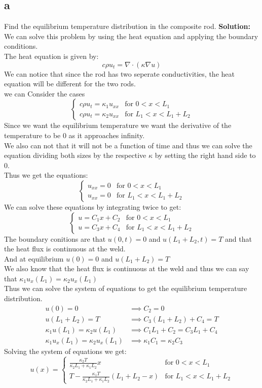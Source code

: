 \documentclass{article}
\begin{document}
\subsection*{a} Find the equilibrium temperature distribution in the composite rod.
\textbf{Solution:}\\
We can solve this problem by using the heat equation and applying the boundary conditions.\\
The heat equation is given by:
$$ c \rho u_t = \nabla \cdot (\kappa \nabla u)$$
We can notice that since the rod has two seperate conductivities, the heat equation will be different for the two rods.\\
we can Consider the cases
$$\begin{cases}
    c \rho u_{t} = \kappa_1 u_{xx} & \text{for } 0 < x < L_1\\
    c \rho u_{t} = \kappa_2 u_{xx} & \text{for } L_1 < x < L_1 + L_2
\end{cases}$$
Since we want the equilibrium temperature we want the derivative of the temperature to be 0 as it approaches infinity.\\
We also can not that it will not be a function of time and thus we can solve the equation dividing both sizes by the respective $\kappa$ by setting the right hand side to 0.\\
Thus we get the equations:
$$\begin{cases}
    u_{xx} = 0 & \text{for } 0 < x < L_1\\
    u_{xx} = 0 & \text{for } L_1 < x < L_1 + L_2
\end{cases}$$
We can solve these equations by integrating twice to get:
$$\begin{cases}
    u = C_1x + C_2 & \text{for } 0 < x < L_1\\
    u = C_3x + C_4 & \text{for } L_1 < x < L_1 + L_2
\end{cases}$$
The boundary conitions are that $u(0,t) = 0$ and $u(L_1 + L_2, t) = T$ and that the heat flux is continuous at the weld.\\
And at equilibrium $u(0) = 0$ and $u(L_1 + L_2) = T$\\
We also know that the heat flux is continuous at the weld and thus we can say that $\kappa_1 u_x(L_1) = \kappa_2 u_x(L_1)$\\
Thus we can solve the system of equations to get the equilibrium temperature distribution.\\
\begin{align*}
    u(0) = 0 & \implies C_2 = 0\\
    u(L_1 + L_2) = T & \implies C_3(L_1 + L_2) + C_4 = T\\
    \kappa_1 u(L_1) = \kappa_2 u(L_1) & \implies C_1L_1 + C_2 = C_3L_1 + C_4\\
    \kappa_1 u_x(L_1) = \kappa_2 u_x(L_1) & \implies \kappa_1C_1 = \kappa_2C_3
\end{align*}
Solving the system of equations we get:
$$ u(x) = \begin{cases}
    \frac{\kappa_2T}{\kappa_2L_1 + \kappa_1L_2}x & \text{for } 0 < x < L_1\\
    T - \frac{\kappa_1T}{\kappa_2L_1 + \kappa_1L_2}(L_1+L_2-x) & \text{for } L_1 < x < L_1 + L_2
\end{cases}$$
\end{document}
